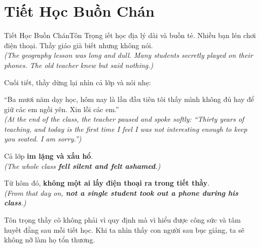 \section{Tiết Học Buồn Chán}
\begin{truyen}{Tiết Học Buồn Chán}{Tôn Trọng}
iết học địa lý dài và buồn tẻ. Nhiều bạn lén chơi điện thoại. Thầy giáo già biết nhưng không nói.\\
\textit{(The geography lesson was long and dull. Many students secretly played on their phones. The old teacher knew but said nothing.)}

Cuối tiết, thầy dừng lại nhìn cả lớp và nói nhẹ:

``Ba mươi năm dạy học, hôm nay là lần đầu tiên tôi thấy mình không đủ hay để giữ các em ngồi yên. Xin lỗi các em.''\\
\textit{(At the end of the class, the teacher paused and spoke softly: ``Thirty years of teaching, and today is the first time I feel I was not interesting enough to keep you seated. I am sorry.'')}

Cả lớp \textbf{im lặng và xấu hổ}.\\
\textit{(The whole class \textbf{fell silent and felt ashamed}.)}

Từ hôm đó, \textbf{không một ai lấy điện thoại ra trong tiết thầy}.\\
\textit{(From that day on, \textbf{not a single student took out a phone during his class}.)}
\end{truyen}
\begin{baihoc}
  Tôn trọng thầy cô không phải vì quy định mà vì hiểu được công sức và tâm huyết đằng sau mỗi tiết học. Khi ta nhìn thấy con người sau bục giảng, ta sẽ không nỡ làm họ tổn thương.
\end{baihoc}

